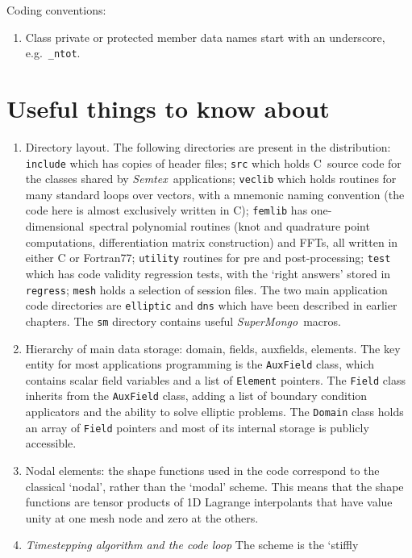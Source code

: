 \documentclass[11pt]{report}
\newcommand{\Semtex}{\emph{Semtex}} \newcommand{\Dog}{\emph{Dog}}
\newcommand{\SM}{\emph{SuperMongo}}
\newcommand\oned{one-di\-men\-sion\-al}
\newcommand{\eg}{e.g.\ } \newcommand{\CC}{\mathrm{c.c.}}
\newcommand\cpp{C\nolinebreak\hspace{-.05em}\raisebox{.3ex}{\footnotesize\bf
+}\nolinebreak\hspace{-.10em}\raisebox{.3ex}{\footnotesize\bf+}}
\begin{document}
Coding conventions:
\begin{enumerate}
\item
Class private or protected member data names start with an underscore,
\eg \texttt{\_ntot}.
\end{enumerate}

\section{Useful things to know about}

\begin{enumerate}
\item
Directory layout.  The following directories are present in the
distribution: \verb|include| which has copies of header files;
\verb|src| which holds \cpp\ source code for the classes shared by
\Semtex\ applications; \verb|veclib| which holds routines for many
standard loops over vectors, with a mnemonic naming convention (the
code here is almost exclusively written in C); \verb|femlib| has
\oned\ spectral polynomial routines (knot and quadrature point
computations, differentiation matrix construction) and FFTs, all
written in either C or Fortran77; \verb|utility| routines for pre and
post-processing; \verb|test| which has code validity regression tests,
with the `right answers' stored in \verb|regress|; \verb|mesh| holds a
selection of session files.  The two main application code
directories are \verb|elliptic| and \verb|dns| which
have been described in earlier chapters.  The \verb|sm| directory
contains useful \SM\ macros.
\item
Hierarchy of main data storage: domain, fields, auxfields,
elements. The key entity for most applications programming is the
\verb|AuxField| class, which contains scalar field variables and a
list of \verb|Element| pointers.  The \verb|Field| class inherits from
the \verb|AuxField| class, adding a list of boundary condition
applicators and the ability to solve elliptic problems.  The
\verb|Domain| class holds an array of \verb|Field| pointers and most
of its internal storage is publicly accessible.
\item
Nodal elements: the shape functions used in the code correspond to the
classical `nodal', rather than the `modal' scheme. This means that the
shape functions are tensor products of 1D Lagrange interpolants that
have value unity at one mesh node and zero at the others.
\item
\textsl{Timestepping algorithm and the code loop} The scheme is the `stiffly

\end{enumerate}
\end{document}
